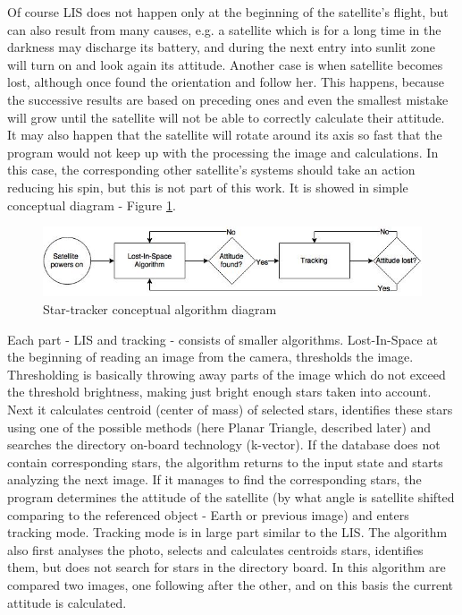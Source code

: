 \documentclass[12pt,a4paper,twoside]{article}
\begin{document}
Of course LIS does not happen only at the beginning of the satellite's flight, but can also result from many causes, e.g. a satellite which is for a long time in the darkness may discharge its battery, and during the next entry into sunlit zone will turn on and look again its attitude. Another case is when satellite becomes lost, although once found the orientation and follow her. This happens, because the successive results are based on preceding ones and even the smallest mistake will grow until the satellite will not be able to correctly calculate their attitude. It may also happen that the satellite will rotate around its axis so fast that the program would not keep up with the processing the image and calculations. In this case, the corresponding other satellite's systems should take an action reducing his spin, but this is not part of this work. It is showed in simple conceptual diagram - Figure \ref{fig:star-tracker_conceptual_alg}.

\begin{figure}[ht]
\includegraphics[scale=0.59]{startracker_eng.jpg}
\centering
\caption{Star-tracker conceptual algorithm diagram}
\label{fig:star-tracker_conceptual_alg}
\end{figure}

Each part - LIS and tracking - consists of smaller algorithms. Lost-In-Space at the beginning of reading an image from the camera, thresholds the image. Thresholding is basically throwing away parts of the image which do not exceed the threshold brightness, making just bright enough stars taken into account. Next it calculates centroid (center of mass) of selected stars, identifies these stars using one of the possible methods (here Planar Triangle, described later) and searches the directory on-board technology (k-vector).
If the database does not contain corresponding stars, the algorithm returns to the input state and starts analyzing the next image. If it manages to find the corresponding stars, the program determines the attitude of the satellite (by what angle is satellite shifted comparing to the referenced object - Earth or previous image) and enters tracking mode. Tracking mode is in large part similar to the LIS. The algorithm also first analyses the photo, selects and calculates centroids stars, identifies them, but does not search for stars in the directory board. In this algorithm are compared two images, one following after the other, and on this basis the current attitude is calculated.
\end{document}
